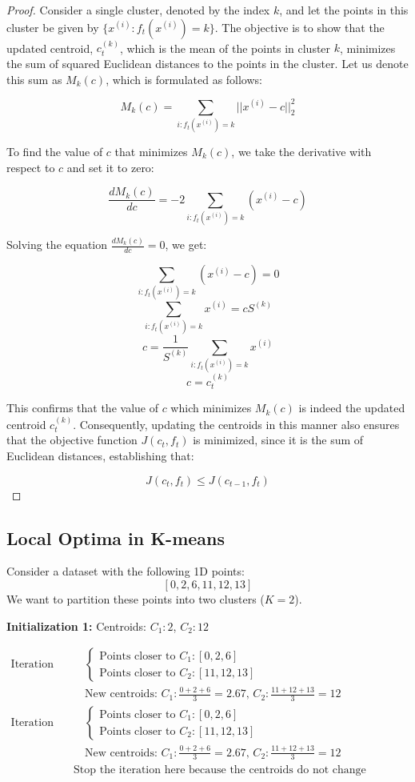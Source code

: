\documentclass{article}
\begin{document}
\begin{proof}
Consider a single cluster, denoted by the index \(k\), and let the points in this cluster be given by \(\{x^{(i)}: f_t(x^{(i)}) = k\}\). The objective is to show that the updated centroid, \(c_t^{(k)}\), which is the mean of the points in cluster \(k\), minimizes the sum of squared Euclidean distances to the points in the cluster. Let us denote this sum as \(M_k(c)\), which is formulated as follows:

\[ M_k(c) = \sum_{i:f_t(x^{(i)}) = k} ||x^{(i)} - c||_2^2 \]

To find the value of \(c\) that minimizes \(M_k(c)\), we take the derivative with respect to \(c\) and set it to zero:

\[ \frac{dM_k(c)}{dc} = -2 \sum_{i:f_t(x^{(i)}) = k} (x^{(i)} - c) \]

Solving the equation \(\frac{dM_k(c)}{dc} = 0\), we get:

\[ \sum_{i:f_t(x^{(i)}) = k} (x^{(i)} - c) = 0 \]
\[ \sum_{i:f_t(x^{(i)}) = k} x^{(i)} = c S^{(k)} \]
\[ c = \frac{1}{S^{(k)}} \sum_{i:f_t(x^{(i)}) = k} x^{(i)} \]
\[ c = c_t^{(k)} \]

This confirms that the value of \(c\) which minimizes \(M_k(c)\) is indeed the updated centroid \(c_t^{(k)}\). Consequently, updating the centroids in this manner also ensures that the objective function \(J(c_t, f_t)\) is minimized, since it is the sum of Euclidean distances, establishing that:

\[ J(c_t, f_t) \leq J(c_{t-1}, f_t) \]
\end{proof}


\subsection{Local Optima in K-means}

Consider a dataset with the following 1D points:
\[ [0, 2, 6, 11, 12, 13] \]
We want to partition these points into two clusters ($K=2$).

\textbf{Initialization 1:} Centroids: $C_1: 2$, $C_2: 12$

\begin{align*}
\text{Iteration 1:} & \quad 
    \begin{cases} 
    \text{Points closer to } C_1: [0, 2, 6] \\
    \text{Points closer to } C_2: [11, 12, 13] 
    \end{cases} \\
& \quad \text{New centroids: } 
    C_1: \frac{0+2+6}{3} = 2.67, \, 
    C_2: \frac{11+12+13}{3} = 12\\
\text{Iteration 2:} & \quad 
    \begin{cases} 
    \text{Points closer to } C_1: [0, 2, 6] \\
    \text{Points closer to } C_2: [11, 12, 13] 
    \end{cases} \\
& \quad \text{New centroids: } 
    C_1: \frac{0+2+6}{3} = 2.67, \, 
    C_2: \frac{11+12+13}{3} = 12\\
& \text{Stop the iteration here because the centroids do not change anymore.}
\end{align*}
\end{document}

